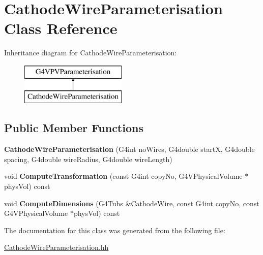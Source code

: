 \hypertarget{classCathodeWireParameterisation}{\section{Cathode\-Wire\-Parameterisation Class Reference}
\label{classCathodeWireParameterisation}
}
Inheritance diagram for Cathode\-Wire\-Parameterisation\-:\begin{figure}[H]
\begin{center}
\leavevmode
\includegraphics[height=2.000000cm]{classCathodeWireParameterisation}
\end{center}
\end{figure}
\subsection*{Public Member Functions}
\begin{DoxyCompactItemize}
\item 
\hypertarget{classCathodeWireParameterisation_abce4015ff180441e0271439f1bb00fd3}{{\bfseries Cathode\-Wire\-Parameterisation} (G4int no\-Wires, G4double start\-X, G4double spacing, G4double wire\-Radius, G4double wire\-Length)}\label{classCathodeWireParameterisation_abce4015ff180441e0271439f1bb00fd3}

\item 
\hypertarget{classCathodeWireParameterisation_a99133ca88cbbe015073392341e8ab75f}{void {\bfseries Compute\-Transformation} (const G4int copy\-No, G4\-V\-Physical\-Volume $\ast$phys\-Vol) const }\label{classCathodeWireParameterisation_a99133ca88cbbe015073392341e8ab75f}

\item 
\hypertarget{classCathodeWireParameterisation_a48c0259d9eabc4292431be2d677b2922}{void {\bfseries Compute\-Dimensions} (G4\-Tubs \&Cathode\-Wire, const G4int copy\-No, const G4\-V\-Physical\-Volume $\ast$phys\-Vol) const }\label{classCathodeWireParameterisation_a48c0259d9eabc4292431be2d677b2922}

\end{DoxyCompactItemize}


The documentation for this class was generated from the following file\-:\begin{DoxyCompactItemize}
\item 
\hyperlink{CathodeWireParameterisation_8hh}{Cathode\-Wire\-Parameterisation.\-hh}\end{DoxyCompactItemize}
